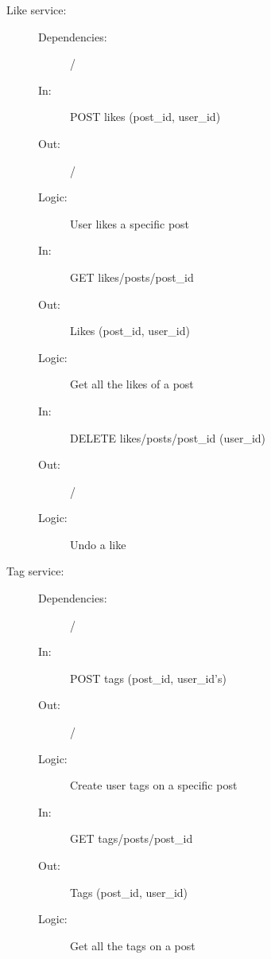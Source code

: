 \documentclass{article}
\begin{document}
\begin{description}
    \item [Like service:]
    \begin{description}
        \item[]
        \item[Dependencies:] /
    \end{description}
    \begin{description}
        \item[]
        \item[In:] POST likes (post\_id, user\_id)
        \item[Out:] /
        \item[Logic:] User likes a specific post
        \item[]

        \item[In:] GET likes/posts/post\_id
        \item[Out:] Likes (post\_id, user\_id)
        \item[Logic:] Get all the likes of a post
        \item[]

        \item[In:] DELETE likes/posts/post\_id (user\_id)
        \item[Out:] /
        \item[Logic:] Undo a like
        \item[]
    \end{description}
\end{description}

\begin{description}
    \item [Tag service:]
    \begin{description}
        \item[]
        \item[Dependencies:] /
    \end{description}
    \begin{description}
        \item[]
        \item[In:] POST tags (post\_id, user\_id's)
        \item[Out:] /
        \item[Logic:] Create user tags on a specific post
        \item[]

        \item[In:] GET tags/posts/post\_id
        \item[Out:] Tags (post\_id, user\_id)
        \item[Logic:] Get all the tags on a post
        \item[]
    \end{description}
\end{description}
\end{document}
